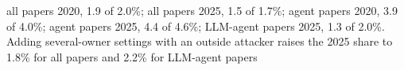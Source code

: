 all papers 2020, 1.9 of 2.0\%; all papers 2025, 1.5 of 1.7\%; agent papers 2020, 3.9 of 4.0\%; agent papers 2025, 4.4 of 4.6\%; LLM-agent papers 2025, 1.3 of 2.0\%. Adding several-owner settings with an outside attacker raises the 2025 share to 1.8\% for all papers and 2.2\% for LLM-agent papers